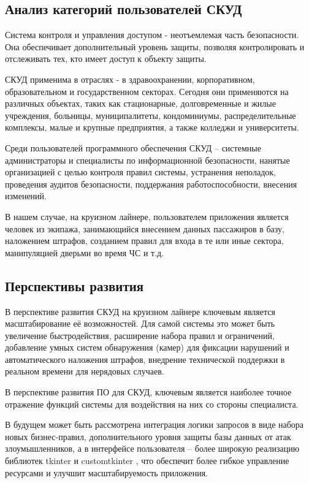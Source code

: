 \subsection{Анализ категорий пользователей СКУД}

Система контроля и управления доступом - неотъемлемая часть безопасности. Она обеспечивает дополнительный уровень защиты, позволяя контролировать и отслеживать тех, кто имеет доступ к объекту защиты.

СКУД применима в отраслях - в здравоохранении, корпоративном, образовательном и государственном секторах. Сегодня они применяются на различных объектах, таких как стационарные, долговременные и жилые учреждения, больницы, муниципалитеты, кондоминиумы, распределительные комплексы, малые и крупные предприятия, а также колледжи и университеты.

Среди пользователей программного обеспечения СКУД -- системные администраторы и специалисты по информационной безопасности, нанятые организацией с целью контроля правил системы, устранения неполадок, проведения аудитов безопасности, поддержания работоспособности, внесения изменений.

В нашем случае, на круизном лайнере, пользователем приложения является человек из экипажа, занимающийся внесением данных пассажиров в базу, наложением штрафов, созданием правил для входа в те или иные сектора, манипуляцией дверьми во время ЧС и т.д.

\subsection{Перспективы развития}
В перспективе развития СКУД на круизном лайнере ключевым является масштабирование её возможностей. Для самой системы это может быть увеличение быстродействия, расширение набора правил и ограничений, добавление умных систем обнаружения (камер) для фиксации нарушений и автоматического наложения штрафов, внедрение технической поддержки в реальном времени для нерядовых случаев.

В перспективе развития ПО для СКУД, ключевым является наиболее точное отражение функций системы для воздействия на них со стороны специалиста.

В будущем может быть рассмотрена интеграция логики запросов в виде набора новых бизнес-правил, дополнительного уровня защиты базы данных от атак злоумышленников, а в интерфейсе пользователя – более широкую реализацию библиотек \textquotedbl tkinter \textquotedbl и \textquotedbl customtkinter \textquotedbl, что обеспечит более гибкое управление ресурсами и улучшит масштабируемость приложения.

